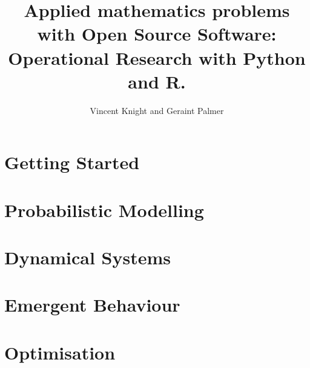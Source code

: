 \documentclass[Alon2,singlecolor,11pt]{Alon}
\title{Applied mathematics problems with Open Source Software:
       Operational Research with Python and R.}
\author{Vincent Knight and Geraint Palmer}
\begin{document}
\frontmatter



\halftitle

\booktitle

\locpage



\cleardoublepage
\setcounter{page}{7} %
\tableofcontents






\mainmatter

\part{Getting Started}


\part{Probabilistic Modelling}


\part{Dynamical Systems}


\part{Emergent Behaviour}


\part{Optimisation}



\printbibliography

\printindex
\cleardoublepage
\end{document}
